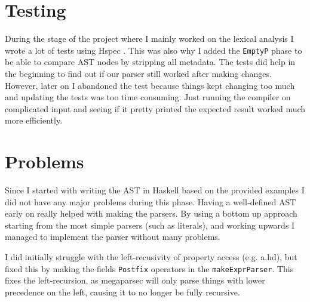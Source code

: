 \documentclass{report}
\begin{document}
\section{Testing}

During the stage of the project where I mainly worked on the lexical analysis I wrote a lot of tests using Hspec \cite{hspec}. This was also why I added the \texttt{EmptyP} phase to be able to compare AST nodes by stripping all metadata. The tests did help in the beginning to find out if our parser still worked after making changes. However, later on I abandoned the test because things kept changing too much and updating the tests was too time consuming. Just running the compiler on complicated input and seeing if it pretty printed the expected result worked much more efficiently.

\section{Problems}

Since I started with writing the AST in Haskell based on the provided examples I did not have any major problems during this phase. Having a well‑defined AST early on really helped with making the parsers. By using a bottom up approach starting from the most simple parsers (such as literals), and working upwards I managed to implement the parser without many problems.

I did initially struggle with the left‑recusivity of property access (e.g. a.hd), but fixed this by making the fields \texttt{Postfix} operators in the \texttt{makeExprParser}. This fixes the left‑recursion, as megaparsec
will only parse things with lower precedence on the left, causing it to no longer be fully recursive. 

\iffalse
\begin{itemize}
	\item How did you design the Abstract Syntax Tree
	\item How does the parser work?
	\item How did you handle difficult things like fixity, associativity etc.
	\item Is there error handling? Recovery?
	\item Do you have a lexer and parser?
	\item How do they communicate?
	\item Problems?
	\item\ldots
\end{itemize}
\fi
\end{document}
